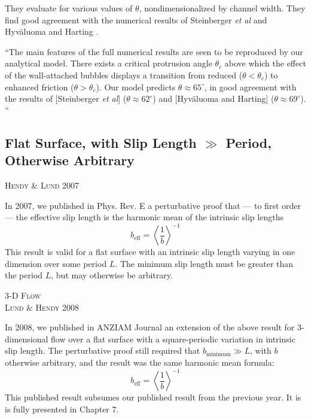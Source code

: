 \documentclass[12pt, a4paper, twoside, openright]{book}
\newcommand{\beff}{\ensuremath{b_{\mathrm{eff}}}}
\newcommand{\paper}[1]
         {\colorbox[gray]{0.8}{ \textsc{#1}}
         
         }
\begin{document}
They evaluate for various values of $\theta$, nondimensionalized by channel width.  They find good agreement with the numerical results of Steinberger \emph{et al} \cite{Steinberger2007} and Hyv\"{a}luoma and Harting \cite{HyvaluomaHarting2008}.

``The main features of the full numerical results are seen to be reproduced by our analytical model.  There exists a critical protrusion angle $ \theta_c$ above which the effect of the wall-attached bubbles displays a transition from reduced ($ \theta < \theta_c $) to enhanced friction ($ \theta > \theta_c $).  Our model predicts $ \theta \approx 65^{\circ} $, in good agreement with the results of [Steinberger \emph{et al}] ($ \theta \approx 62^{\circ} $) and [Hyv\"{a}luoma and Harting] ($ \theta \approx 69^{\circ} $). ''

\subsection*{Flat Surface, with Slip Length $\gg$ Period, Otherwise Arbitrary}

\paper{Hendy \& Lund 2007}
In 2007, we published in Phys. Rev. E \cite{HendyLund2007} a perturbative proof that --- to first order --- the effective slip length is the harmonic mean of the intrinsic slip lengths
\begin{equation}
\beff = \left< \frac{1}{b} \right>^{-1}
\end{equation}
This result is valid for a flat surface with an intrinsic slip length varying in one dimension over some period $L$.  The minimum slip length must be greater than the period $L$, but may otherwise be arbitrary.

\vspace{1em}
\colorbox[gray]{0.8}{ \textsc{3-D Flow} }
\vspace{0.5em} \\

\paper{Lund \& Hendy 2008}
In 2008, we published in ANZIAM Journal \cite{LundHendy2008} an extension of the above result for 3-dimensional flow over a flat surface with a square-periodic variation in intrinsic slip length.  The perturbative proof still required that $b_{\mathrm{minimum}} \gg L$, with $b$ otherwise arbitrary, and the result was the same harmonic mean formula:
\begin{equation}
\beff = \left< \frac{1}{b} \right>^{-1}
\end{equation}
This published result subsumes our published result from the previous year.  It is is fully presented in Chapter 7.
\end{document}
